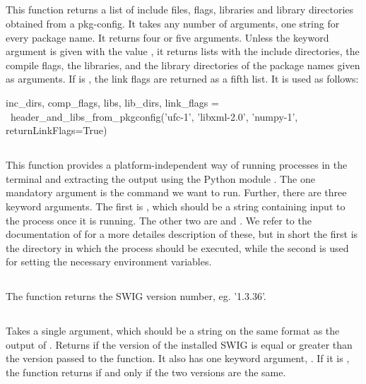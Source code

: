 \subsection[header\_and\_libs\_from\_pkgconfig]{}
This function returns a list of include files, flags, libraries and library
directories obtained from a
pkg-config. It takes any
number of arguments, one string for every package name.
It returns four or five arguments. Unless the keyword
argument  is given with the value , it returns
lists with the include directories, the compile flags, the libraries, and the library
directories of the package names given as arguments. If 
is , the link flags are returned as a fifth list. 
It is used as follows: 
\begin{code}
inc_dirs, comp_flags, libs, lib_dirs, link_flags = \
header_and_libs_from_pkgconfig('ufc-1', 'libxml-2.0',
                               'numpy-1',
                               returnLinkFlags=True)
\end{code}

\subsection[get\_status\_output]{}
This function provides a platform-independent way of running processes in the
terminal and extracting the output using the Python
module . The
one mandatory argument is the command we want to run. Further, there are three
keyword arguments. The first is \emp{input}, which should be a string
containing input to the process once it is running. The other two
are \emp{cwd} and \emp{env}. We refer to the documentation of 
for a more detailes description of these, but in short the first is the
directory in which the process should be executed, while the second is used
for setting the necessary environment variables.

\subsection[get\_swig\_version]{}
The function returns the SWIG version number, eg. '1.3.36'. 

\subsection[check\_swig\_version]{}
Takes a single argument, which should be a string on the same format as the
output of \emp{get\_\-swig\_\-version}. Returns \emp{True} if the version of the
installed SWIG is equal or greater than the version passed to the function. It
also has one keyword argument, \emp{same}. If it is , the function
returns \emp{True} if and only if the two versions are the same.

